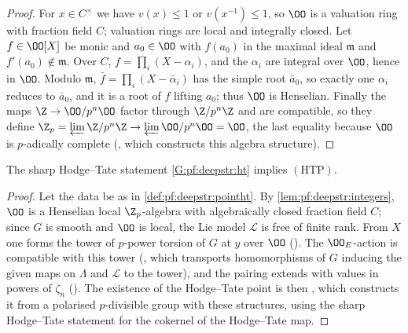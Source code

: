 \begin{proof}
For $x\in C^\times$ we have $v(x)\le1$ or $v(x^{-1})\le1$, so $\OO$ is a valuation ring with fraction field $C$; valuation
rings are local and integrally closed. Let $f\in\OO[X]$ be monic and $a_0\in\OO$ with $f(a_0)$ in the maximal ideal
$\mathfrak m$ and $f'(a_0)\notin\mathfrak m$. Over $C$, $f=\prod_i(X-\alpha_i)$, and the $\alpha_i$ are integral over $\OO$, hence in $\OO$.
Modulo $\mathfrak m$, $\bar f=\prod_i(X-\bar\alpha_i)$ has the simple root $\bar a_0$, so exactly one $\alpha_i$ reduces to $\bar a_0$, and it is a
root of $f$ lifting $a_0$; thus $\OO$ is Henselian. Finally the maps $\Z\to\OO/p^n\OO$ factor through $\Z/p^n\Z$ and are
compatible, so they define $\Z_p=\varprojlim\Z/p^n\Z\to\varprojlim\OO/p^n\OO=\OO$, the last equality because $\OO$ is $p$-adically
complete (, which constructs
this algebra structure).
\end{proof}

\begin{theorem}\label{thm:pf:deepstr:pointht}
The sharp Hodge--Tate statement \ref{G:pf:deepstr:ht} implies $\mathrm{(HTP)}$.
\end{theorem}

\begin{proof}
Let the data be as in \cref{def:pf:deepstr:pointht}. By \cref{lem:pf:deepstr:integers}, $\OO$ is a Henselian local
$\Z_p$-algebra with algebraically closed fraction field $C$; since $G$ is smooth and $\OO$ is local, the Lie model
$\mathcal L$ is free of finite rank. From $X$ one forms the tower of $p$-power torsion of $G$ at $y$
over $\OO$ (). The $\OO_E$-action is compatible with
this tower (, which transports homomorphisms of $G$
inducing the given maps on $\Lambda$ and $\mathcal L$ to the tower), and the pairing extends with values in powers of
$\zeta_n$ (). The existence of the
Hodge--Tate point is then , which constructs it
from a polarised $p$-divisible group with these structures, using the sharp Hodge--Tate statement for the
cokernel of the Hodge--Tate map.
\end{proof}

